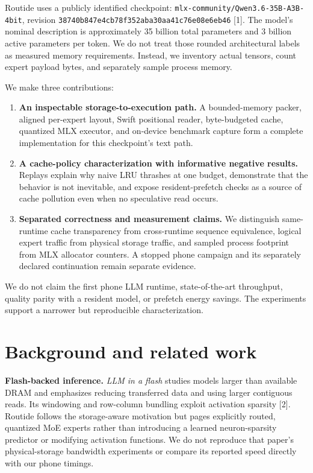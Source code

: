 \documentclass[11pt]{article}
\providecommand{\tightlist}{%
  \setlength{\itemsep}{0pt}\setlength{\parskip}{0pt}}
\begin{document}
Routide uses a publicly identified checkpoint:
\texttt{mlx-community/Qwen3.6-35B-A3B-4bit}, revision
\texttt{38740b847e4cb78f352aba30aa41c76e08e6eb46} {[}1{]}. The model's nominal description
is approximately 35 billion total parameters and 3 billion active parameters
per token. We do not treat those rounded architectural labels as measured
memory requirements. Instead, we inventory actual tensors, count expert
payload bytes, and separately sample process memory.

We make three contributions:

\begin{enumerate}
\def\labelenumi{\arabic{enumi}.}
\tightlist
\item
  \textbf{An inspectable storage-to-execution path.} A bounded-memory packer,
  aligned per-expert layout, Swift positional reader, byte-budgeted cache,
  quantized MLX executor, and on-device benchmark capture form a complete
  implementation for this checkpoint's text path.
\item
  \textbf{A cache-policy characterization with informative negative results.}
  Replays explain why naive LRU thrashes at one budget, demonstrate that
  the behavior is not inevitable, and expose resident-prefetch checks as
  a source of cache pollution even when no speculative read occurs.
\item
  \textbf{Separated correctness and measurement claims.} We distinguish
  same-runtime cache transparency from cross-runtime sequence equivalence,
  logical expert traffic from physical storage traffic, and sampled process
  footprint from MLX allocator counters. A stopped phone campaign and its
  separately declared continuation remain separate evidence.
\end{enumerate}

We do not claim the first phone LLM runtime, state-of-the-art throughput,
quality parity with a resident model, or prefetch energy savings. The
experiments support a narrower but reproducible characterization.

\hypertarget{background-and-related-work}{%
\section{Background and related work}\label{background-and-related-work}}

\textbf{Flash-backed inference.} \emph{LLM in a flash} studies models larger than available
DRAM and emphasizes reducing transferred data and using larger contiguous
reads. Its windowing and row-column bundling exploit activation sparsity {[}2{]}.
Routide follows the storage-aware motivation but pages explicitly routed,
quantized MoE experts rather than introducing a learned neuron-sparsity
predictor or modifying activation functions. We do not reproduce that paper's
physical-storage bandwidth experiments or compare its reported speed directly
with our phone timings.
\end{document}
